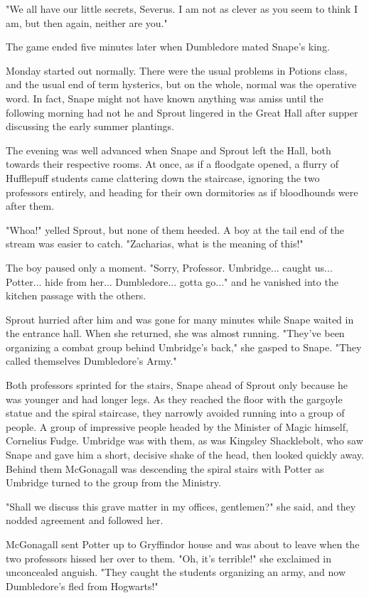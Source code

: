 "We all have our little secrets, Severus. I am not as clever as you seem to think I am, but then again, neither are you."

The game ended five minutes later when Dumbledore mated Snape's king.

Monday started out normally. There were the usual problems in Potions class, and the usual end of term hysterics, but on the whole, normal was the operative word. In fact, Snape might not have known anything was amiss until the following morning had not he and Sprout lingered in the Great Hall after supper discussing the early summer plantings.

The evening was well advanced when Snape and Sprout left the Hall, both towards their respective rooms. At once, as if a floodgate opened, a flurry of Hufflepuff students came clattering down the staircase, ignoring the two professors entirely, and heading for their own dormitories as if bloodhounds were after them.

"Whoa!" yelled Sprout, but none of them heeded. A boy at the tail end of the stream was easier to catch. "Zacharias, what is the meaning of this!"

The boy paused only a moment. "Sorry, Professor. Umbridge... caught us... Potter... hide from her... Dumbledore... gotta go..." and he vanished into the kitchen passage with the others.

Sprout hurried after him and was gone for many minutes while Snape waited in the entrance hall. When she returned, she was almost running. "They've been organizing a combat group behind Umbridge's back," she gasped to Snape. "They called themselves Dumbledore's Army."

Both professors sprinted for the stairs, Snape ahead of Sprout only because he was younger and had longer legs. As they reached the floor with the gargoyle statue and the spiral staircase, they narrowly avoided running into a group of people. A group of impressive people headed by the Minister of Magic himself, Cornelius Fudge. Umbridge was with them, as was Kingsley Shacklebolt, who saw Snape and gave him a short, decisive shake of the head, then looked quickly away. Behind them McGonagall was descending the spiral stairs with Potter as Umbridge turned to the group from the Ministry.

"Shall we discuss this grave matter in my offices, gentlemen?" she said, and they nodded agreement and followed her.

McGonagall sent Potter up to Gryffindor house and was about to leave when the two professors hissed her over to them. "Oh, it's terrible!" she exclaimed in unconcealed anguish. "They caught the students organizing an army, and now Dumbledore's fled from Hogwarts!"

